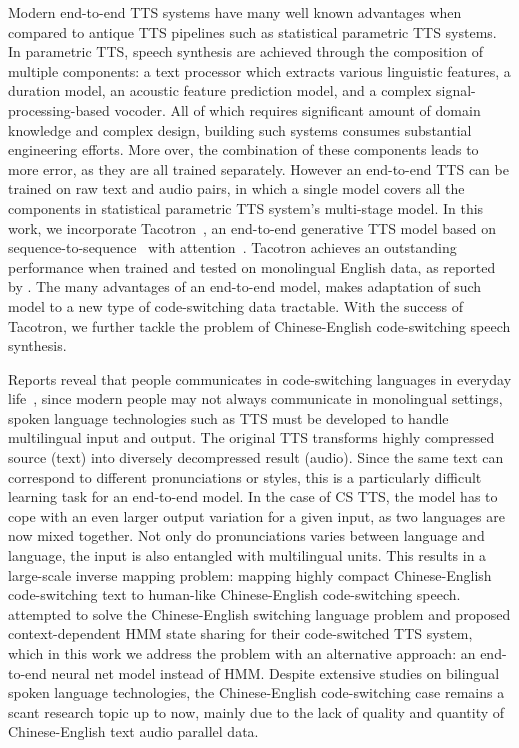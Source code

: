 \documentclass{article} %
\begin{document}
\begin{CJK}{UTF8}{bsmi}
Modern end-to-end TTS systems have many well known advantages when compared to antique TTS pipelines such as statistical parametric TTS systems. In parametric TTS, speech synthesis are achieved through the composition of multiple components: a text processor which extracts various linguistic features, a duration model, an acoustic feature prediction model, and a complex signal-processing-based vocoder. All of which requires significant amount of domain knowledge and complex design, building such systems consumes substantial engineering efforts. More over, the combination of these components leads to more error, as they are all trained separately. However an end-to-end TTS can be trained on raw text and audio pairs, in which a single model covers all the components in statistical parametric TTS system's multi-stage model. In this work, we incorporate Tacotron~\citep{Wang2017}, an end-to-end generative TTS model based on sequence-to-sequence~\citep{Sutskever2014} with attention~\citep{Bahdanau2014}. Tacotron achieves an outstanding performance when trained and tested on monolingual English data, as reported by \citet{Wang2017}. The many advantages of an end-to-end model, makes adaptation of such model to a new type of code-switching data tractable. With the success of Tacotron, we further tackle the problem of Chinese-English code-switching speech synthesis.

Reports reveal that people communicates in code-switching languages in everyday life~\citep{Nakayama12018}, since modern people may not always communicate in monolingual settings, spoken language technologies such as TTS must be developed to handle multilingual input and output. The original TTS transforms highly compressed source (text) into diversely decompressed result (audio). Since the same text can correspond to different pronunciations or styles, this is a particularly difficult learning task for an end-to-end model. In the case of CS TTS, the model has to cope with an even larger output variation for a given input, as two languages are now mixed together. Not only do pronunciations varies between language and language, the input is also entangled with multilingual units. This results in a large-scale inverse mapping problem: mapping highly compact Chinese-English code-switching text to human-like Chinese-English code-switching speech. \citet{Liang2007} attempted to solve the Chinese-English switching language problem and proposed context-dependent HMM state sharing for their code-switched TTS system, which in this work we address the problem with an alternative approach: an end-to-end neural net model instead of HMM. Despite extensive studies on bilingual spoken language technologies, the Chinese-English code-switching case remains a scant research topic up to now, mainly due to the lack of quality and quantity of Chinese-English text audio parallel data.


\end{CJK}
\end{document}
